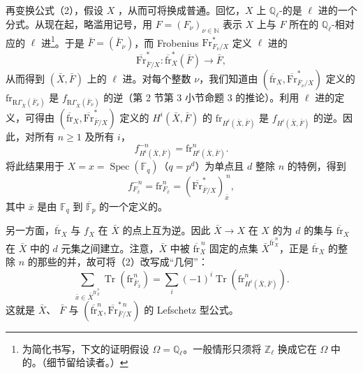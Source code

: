 再变换公式（2），假设 $X$ ，从而可将换成普通。回忆，$X$ 上 $\mathbb Q_\ell$-的是 $\ell$ 进的一个分式。从现在起，略滥用记号，用 $F=(F_\nu)_{\nu\in\mathbb N}$ 表示 $X$ 上与 $F$ 所在的 $\mathbb Q_\ell$-相对应的 $\ell$ 进\footnote{为简化书写，下文的证明假设 $\Omega=\mathbb Q_\ell$。一般情形只须将 $\mathbb Z_\ell$ 换成它在 $\Omega$ 中的。（细节留给读者。）}。于是 $\bar F=(\bar F_\nu)$，而 Frobenius  $\mathrm{Fr}_{F_\nu/X}^{*}$ 定义 $\ell$ 进的
\[
\overline{\mathrm{Fr}}_{\bar F/X}^{*}:\overline{\mathrm{fr}}_X^*(\bar F)\longrightarrow\bar F,
\]
从而得到 $(\bar X,\bar F)$ 上的 $\ell$ 进。对每个整数 $\nu$，我们知道由 $(\overline{\mathrm{fr}}_X,\overline{\mathrm{Fr}}_{\bar F_\nu/X}^{*})$ 定义的 $\mathrm{fr}_{\mathrm R\Gamma_{\bar X}(\bar F_\nu)}$ 是 $f_{\mathrm R\Gamma_{\bar X}(\bar F_\nu)}$ 的逆（第 2 节第 3 小节命题 3 的推论）。利用 $\ell$ 进的定义，可得由 $(\overline{\mathrm{fr}}_X,\overline{\mathrm{Fr}}_{\bar F/X}^{*})$ 定义的 $H^i(\bar X,\bar F)$ 的 $\mathrm{fr}_{H^i(\bar X,\bar F)}$ 是 $f_{H^i(\bar X,\bar F)}$ 的逆。因此，对所有 $n\geq1$ 及所有 $i$，
\[
f_{H^i(\bar X,\bar F)}^{-n}=\mathrm{fr}_{H^i(\bar X,\bar F)}^n.
\]
将此结果用于 $X=x=\operatorname{Spec}(\mathbb F_q)$（$q=p^d$）为单点且 $d$ 整除 $n$ 的特例，得到
\[
f_{F_{\bar x}}^{-n}=\mathrm{fr}_{F_{\bar x}}^n
=(\overline{\mathrm{Fr}}_{\bar F/X}^{*})_{\bar x}^{\,n},
\]
其中 $\bar x$ 是由 $\mathbb F_q$ 到 $\overline{\mathbb F}_p$ 的一个定义的。

另一方面，$\overline{\mathrm{fr}}_X$ 与 $f_X$ 在 $\bar X$ 的点上互为逆。因此 $\bar X\to X$ 在 $X$ 的为 $d$ 的集与 $\overline{\mathrm{fr}}_X$ 在 $\bar X$ 中的 $d$ 元集之间建立。注意，$\bar X$ 中被 $\overline{\mathrm{fr}}_X^{\,n}$ 固定的点集 $\bar X^{\overline{\mathrm{fr}}_X^{\,n}}$，正是 $\overline{\mathrm{fr}}_X$ 的整除 $n$ 的那些的并，故可将（2）改写成“几何”：
\[
\sum_{\bar x\in\bar X^{\overline{\mathrm{fr}}_X^{\,n}}}
\operatorname{Tr}(\mathrm{fr}_{\bar F_{\bar x}}^n)
=\sum_i(-1)^i\operatorname{Tr}(\mathrm{fr}_{H^i(\bar X,\bar F)}^n).
\tag{2'}
\]
这就是 $\bar X$、 $\bar F$ 与 $(\overline{\mathrm{fr}}_X^n,\overline{\mathrm{Fr}}_{\bar F/X}^{*\,n})$ 的 Lefschetz 型公式。

